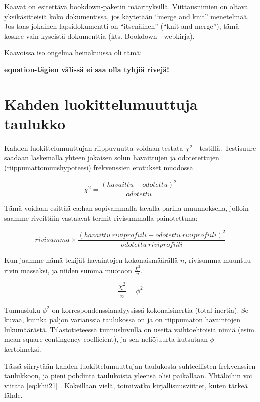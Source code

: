 \documentclass[
  finnish,
]{book}
\begin{document}
Kaavat on esitettävä bookdown-paketin määrityksillä. Viittausnimien on oltava yksikäsitteisiä koko dokumentissa, jos käytetään ``merge and knit'' menetelmää. Jos taas jokainen lapsidokumentti on ``itsenäinen'' (``knit and merge''), tämä koskee vain kyseistä dokumenttia (kts. Bookdown - webkirja).

Kaavoissa iso ongelma heinäkuussa oli tämä:

\textbf{equation-tägien välissä ei saa olla tyhjiä rivejä!}

\hypertarget{kahden-luokittelumuuttuja-taulukko}{%
\section{Kahden luokittelumuuttuja taulukko}\label{kahden-luokittelumuuttuja-taulukko}}

Kahden luokittelumuuttujan riippuvuutta voidaan testata \(\chi^{2}\) - testillä. Testisuure saadaan laskemalla yhteen jokaisen solun havaittujen ja odotetettujen (riippumattomuushypoteesi) frekvenssien erotukset muodossa

\begin{equation}
  \chi^{2} = \frac{(havaittu - odotettu)^2} {odotettu}
  \label{eq:khii21}
\end{equation}

Tämä voidaan esittää ca:han sopivammalla tavalla parilla muunnoksella, jolloin saamme riveittäin vastaavat termit rivisummalla painotettuna:

\begin{equation}
  rivisumma \times \frac{(havaittu \: riviprofiili - odotettu \: riviprofiili)^2} {odotettu \: riviprofiili}
  \label{eq:khii22}
\end{equation}

Kun jaamme nämä tekijät havaintojen kokonaismäärällä \(n\), rivisumma muuntuu rivin massaksi, ja niiden summa muotoon \(\frac{\chi^{2}}{n}\).

\begin{equation}
 \frac{\chi^{2}}{n} = \phi^{2}
 \label{eq:inert1}
\end{equation}

Tunnusluku \(\phi^{2}\) on korrespondenssianalyysissä kokonaisinertia (total inertia). Se kuvaa, kuinka paljon varianssia taulukossa on ja on riippumaton havaintojen lukumäärästä. Tilastotieteessä tunnusluvulla on useita vaihtoehtoisia nimiä (esim. mean square contingency coefficient), ja sen neliöjuurta kutsutaan \(\phi\) - kertoimeksi.

Tässä siirrytään kahden luokittelumuuttujan taulukosta suhteellisten frekvenssien taulukkoon, ja pieni pohdinta taulukoista yleensä olisi paikallaan. Yhtälöihin voi viitata \eqref{eq:khii21} . Kokeillaan vielä, toimivatko kirjallisuusviittet, kuten tärkeä lähde\citep{RefWorks:55}.
\end{document}
